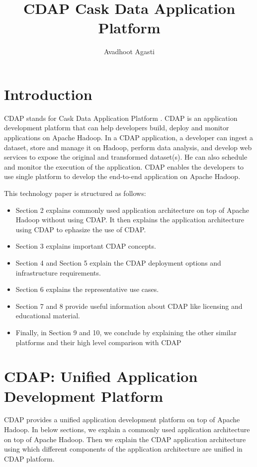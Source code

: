 \documentclass[9pt,twocolumn,twoside]{../../styles/osajnl}
\title{CDAP Cask Data Application Platform}
\author[1,*, +]{Avadhoot Agasti}
\affil[1]{School of Informatics and Computing, Bloomington, IN 47408, U.S.A.}
\affil[*]{Corresponding authors: aagasti@indiana.edu}
\affil[+]{HID - SL-IO-3000}
\begin{document}
\maketitle

\section{Introduction}

CDAP stands for Cask Data Application Platform \cite{www-cask-io}. CDAP is an
application development platform that can help developers build, deploy and
 monitor applications on Apache Hadoop. In a CDAP application, a
 developer can ingest a dataset, store and manage it on Hadoop, perform
 data analysis, and develop web services to expose the original and
 transformed dataset(s). He can also schedule and monitor the execution of
 the application. CDAP enables the developers to use single platform to
 develop the end-to-end application on Apache Hadoop.

This technology paper is structured as follows:
\begin{itemize}
\item Section 2 explains commonly used application architecture on top of
Apache Hadoop without using CDAP. It then explains the application
architecture using CDAP to ephasize the use of CDAP.
\item Section 3 explains important CDAP concepts.
\item Section 4 and Section 5 explain the CDAP deployment options and
infrastructure requirements.
\item Section 6 explains the representative use cases.
\item Section 7 and 8 provide useful information about CDAP like licensing
and educational material.
\item Finally, in Section 9 and 10, we conclude by explaining the other similar
platforms and their high level comparison with CDAP
\end{itemize}

\section{CDAP: Unified Application Development Platform}
CDAP provides a unified application development platform on top of Apache
Hadoop. In below sections, we explain a commonly used application
architecture on top of Apache Hadoop. Then we explain the CDAP application
architecture using which different components of the application architecture
 are unified in CDAP platform.
\end{document}
